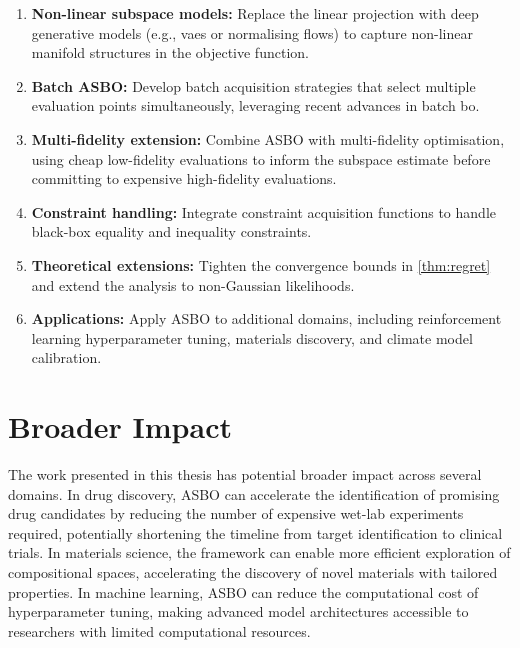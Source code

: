 \begin{enumerate}
    \item \textbf{Non-linear subspace models:} Replace the linear projection
    with deep generative models (e.g., \glspl{vae} or normalising flows) to
    capture non-linear manifold structures in the objective function.

    \item \textbf{Batch ASBO:} Develop batch acquisition strategies that select
    multiple evaluation points simultaneously, leveraging recent advances in
    batch \gls{bo}.

    \item \textbf{Multi-fidelity extension:} Combine ASBO with multi-fidelity
    optimisation, using cheap low-fidelity evaluations to inform the subspace
    estimate before committing to expensive high-fidelity evaluations.

    \item \textbf{Constraint handling:} Integrate constraint acquisition
    functions to handle black-box equality and inequality constraints.

    \item \textbf{Theoretical extensions:} Tighten the convergence bounds in
    \cref{thm:regret} and extend the analysis to non-Gaussian likelihoods.

    \item \textbf{Applications:} Apply ASBO to additional domains, including
    reinforcement learning hyperparameter tuning, materials discovery, and
    climate model calibration.
\end{enumerate}

\section{Broader Impact}
\label{sec:broader-impact}

The work presented in this thesis has potential broader impact across several
domains.  In drug discovery, ASBO can accelerate the identification of
promising drug candidates by reducing the number of expensive wet-lab
experiments required, potentially shortening the timeline from target
identification to clinical trials.  In materials science, the framework can
enable more efficient exploration of compositional spaces, accelerating the
discovery of novel materials with tailored properties.  In machine learning,
ASBO can reduce the computational cost of hyperparameter tuning, making
advanced model architectures accessible to researchers with limited
computational resources.

